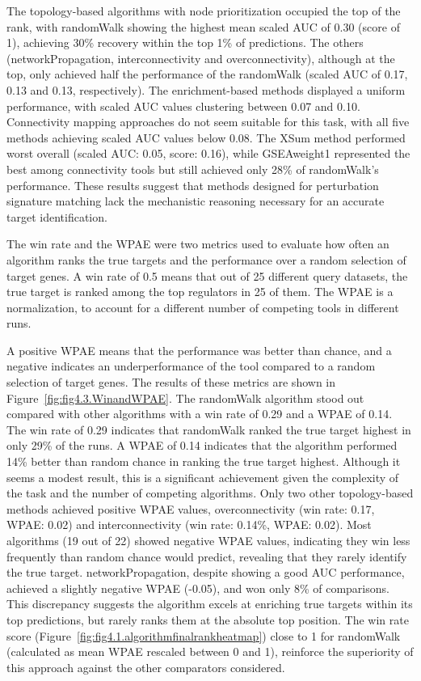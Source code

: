 The topology-based algorithms with node prioritization occupied the top of the rank, with randomWalk showing the highest mean scaled \gls{AUC} of 0.30 (score of 1), achieving 30\% recovery within the top 1\% of predictions.
The others (networkPropagation, interconnectivity and overconnectivity), although at the top, only achieved half the performance of the randomWalk (scaled \gls{AUC} of 0.17, 0.13 and 0.13, respectively).
The enrichment-based methods displayed a uniform performance, with scaled \gls{AUC} values clustering between 0.07 and 0.10.
Connectivity mapping approaches do not seem suitable for this task, with all five methods achieving scaled \gls{AUC} values below 0.08.
The XSum method performed worst overall (scaled \gls{AUC}: 0.05, score: 0.16), while GSEAweight1 represented the best among connectivity tools but still achieved only 28\% of randomWalk's performance.
These results suggest that methods designed for perturbation signature matching lack the mechanistic reasoning necessary for an accurate target identification.

The win rate and the \gls{WPAE} were two metrics used to evaluate how often an algorithm ranks the true targets and the performance over a random selection of target genes.
A win rate of 0.5 means that out of 25 different query datasets, the true target is ranked among the top regulators in 25 of them.
The \gls{WPAE} is a normalization, to account for a different number of competing tools in different runs.

A positive \gls{WPAE} means that the performance was better than chance, and a negative indicates an underperformance of the tool compared to a random selection of target genes.
The results of these metrics are shown in Figure~\ref{fig:fig4.3.WinandWPAE}.
The randomWalk algorithm stood out compared with other algorithms with a win rate of 0.29 and a \gls{WPAE} of 0.14.
The win rate of 0.29 indicates that randomWalk ranked the true target highest in only 29\% of the runs.
A \gls{WPAE} of 0.14 indicates that the algorithm performed 14\% better than random chance in ranking the true target highest.
Although it seems a modest result, this is a significant achievement given the complexity of the task and the number of competing algorithms.
Only two other topology-based methods achieved positive WPAE values, overconnectivity (win rate: 0.17, WPAE: 0.02) and interconnectivity (win rate: 0.14\%, \gls{WPAE}: 0.02).
Most algorithms (19 out of 22) showed negative \gls{WPAE} values, indicating they win less frequently than random chance would predict, revealing that they rarely identify the true target.
networkPropagation, despite showing a good \gls{AUC} performance, achieved a slightly negative \gls{WPAE} (-0.05), and won only 8\% of comparisons.
This discrepancy suggests the algorithm excels at enriching true targets within its top predictions, but rarely ranks them at the absolute top position.
The win rate score (Figure~\ref{fig:fig4.1.algorithmfinalrankheatmap}) close to 1 for randomWalk (calculated as mean \gls{WPAE} rescaled between 0 and 1), reinforce the superiority of this approach against the other comparators considered.

